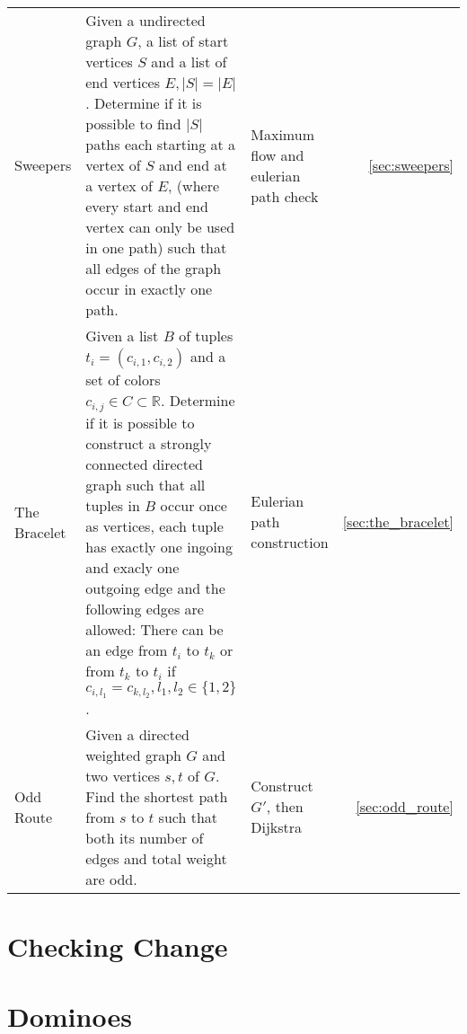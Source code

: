 \documentclass[a4paper, 10pt]{article}
\let\stdsection\section
\renewcommand\section{\newpage\stdsection}
\newcommand{\includecode}[1]{
    }
\newcommand{\algoAuthor}{2} %
\begin{document}
\begin{longtable}{ L{2cm} L{7cm} L{3cm} r}
        Sweepers 
        & Given a undirected graph $G$, a list of start vertices $S$ and a list of end vertices $E, |S|=|E|$.
            Determine if it is possible to find $|S|$ paths each starting at a vertex of $S$ and end at a vertex of $E$, 
            (where every start and end vertex can only be used in one path) such that all edges of the graph occur in exactly one path.   
        & Maximum flow and eulerian path check &  \ref{sec:sweepers} \\

        The Bracelet 
        & Given a list $B$ of tuples $t_i = (c_{i,1}, c_{i,2})$ and a set of colors $c_{i,j}\in C\subset \mathbb{R}$.
            Determine if it is possible to construct a strongly connected directed graph such that all tuples in $B$ occur once as vertices,
            each tuple has exactly one ingoing and exacly one outgoing edge and the following edges are allowed: 
            There can be an edge from $t_i$ to $t_k$ or from $t_k$ to $t_i$ if $c_{i,l_1} = c_{k,l_2}, l_1,l_2\in\{1,2\}$.   
        & Eulerian path construction &  \ref{sec:the_bracelet} \\

        Odd Route
        & Given a directed weighted graph $G$ and two vertices $s,t$ of $G$. Find the shortest path from 
            $s$ to $t$ such that both its number of edges and total weight are odd.
        & Construct $G'$, then Dijkstra &  \ref{sec:odd_route} \\




    \end{longtable}    

    
    \section{Checking Change}
        \label{sec:checking_change}
        \includecode{../problems/w01/Checking_Change/CheckingChange\algoAuthor.cpp}
    
    \section{Dominoes}
        \label{sec:dominoes}
        \includecode{../problems/w01/Dominoes/Dominoes\algoAuthor.cpp}
    
\end{document}
